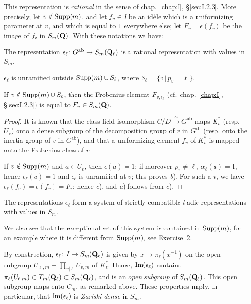 This representation is \emph{rational} in the sense of
chap.~\ref{chap:I}, \S\ref{sec:I.2.3}.  More precisely, let
$v \notin \mathrm{Supp}(m)$, and let $f_v \in I$ be an idèle which is a
uniformizing parameter at $v$, and which is equal to $1$ everywhere
else; let $F_v = \epsilon(f_v)$ be the image of $f_v$ in $S_m(\mathbf{Q})$.
With these notations we have:

\begin{proposition}
\begin{alist}[label=\alph*)]
\item The representation $\epsilon_\ell\colon G^{\mathrm{ab}} \to
S_m(\mathbf{Q}_\ell)$ is a rational representation with values in $S_m$.
\item $\epsilon_\ell$ is unramified outside $\mathrm{Supp}(m) \cup S_\ell$,
where $S_\ell = \{v\,|\,p_v = \ell\}$.
\item If $v \notin \mathrm{Supp}(m) \cup S_\ell$, then the Frobenius element
$F_{v,\epsilon_\ell}$ (cf.~chap.~\ref{chap:I}, \S\ref{sec:I.2.3}) is
equal to $F_v \in S_m(\mathbf{Q})$.
\end{alist}
\end{proposition}

\begin{proof}
It is known that the class field isomorphism
$C/D \xrightarrow{\ \sim\ } G^{\mathrm{ab}}$ maps $K_v^*$ (resp.  $U_v$)
onto a dense subgroup of the decomposition group of $v$ in
$G^{\mathrm{ab}}$ (resp.  onto the inertia group of $v$ in
$G^{\mathrm{ab}}$), and that a uniformizing element $f_v$ of $K_v^*$ is
mapped onto the Frobenius class of $v$.

If $v \notin \mathrm{Supp}(m)$ and $a \in U_v$, then $\epsilon(a) = 1$; if
moreover $p_v \neq \ell$, $\alpha_\ell(a) = 1$, hence
$\epsilon_\ell(a) = 1$ and $\epsilon_\ell$ is unramified at $v$; this
proves \emph{b}).  For such a $v$, we have
$\epsilon_\ell(f_v) = \epsilon(f_v) = F_v$; hence \emph{c}), and
\emph{a}) follows from \emph{c}).
\end{proof}

\begin{corollary}
The representations $\epsilon_\ell$ form a system of strictly compatible
\textit{l}-adic representations with values in $S_m$.
\end{corollary}

We also see that the exceptional set of this system is contained in
$\mathrm{Supp}(m)$; for an example where it is different from $\mathrm{Supp}(m)$, see
Exercise~2.


By construction, $\epsilon_\ell\colon I \to S_m(\mathbf{Q}_\ell)$ is given by
$x \to \pi_\ell(x^{-1})$ on the open subgroup
$U_{\ell,m} = \prod\limits_{v|\ell} U_{v,m}$ of $K_\ell^*$.  Hence,
$\mathrm{Im}(\epsilon_\ell)$ contains
$\pi_\ell(U_{\ell,m}) \subset T_m(\mathbf{Q}_\ell) \subset S_m(\mathbf{Q}_\ell)$, and is
an \emph{open subgroup} of $S_m(\mathbf{Q}_\ell)$.  This open subgroup maps onto
$C_m$, as remarked above.  These properties imply, in particular, that
$\mathrm{Im}(\epsilon_\ell)$ is \emph{Zariski-dense} in $S_m$.


